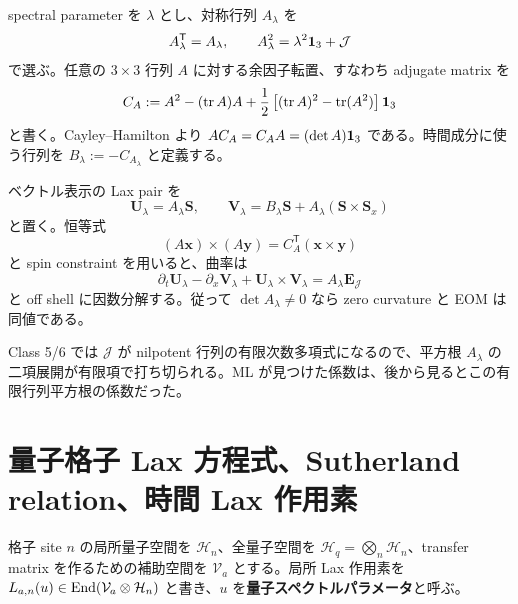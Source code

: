 spectral parameter を $\lambda$ とし、対称行列 $A_\lambda$ を
\begin{equation}
A_\lambda^{\mathsf T}=A_\lambda,\qquad A_\lambda^2=\lambda^2\mathbf 1_{3}+\mathcal J
\label{eq:Aroot}
\end{equation}
で選ぶ。任意の $3\times3$ 行列 $A$ に対する余因子転置、すなわち adjugate matrix を
\begin{equation}
C_A:=A^2-(\operatorname{tr} A)A+\frac12\left[(\operatorname{tr} A)^2-\operatorname{tr}(A^2)\right]\mathbf 1_{3}
\label{eq:adj}
\end{equation}
と書く。Cayley--Hamilton より $AC_A=C_AA=(\det A)\mathbf 1_{3}$ である。時間成分に使う行列を $B_\lambda:=-C_{A_\lambda}$ と定義する。

ベクトル表示の Lax pair を
\begin{equation}
\boldsymbol U_\lambda=A_\lambda\boldsymbol S,
\qquad
\boldsymbol V_\lambda=B_\lambda\boldsymbol S+A_\lambda(\boldsymbol S\times\boldsymbol S_x)
\label{eq:genLax}
\end{equation}
と置く。恒等式
\begin{equation}
(A\boldsymbol x)\times(A\boldsymbol y)=C_A^{\mathsf T}(\boldsymbol x\times\boldsymbol y)
\label{eq:crossadj}
\end{equation}
と spin constraint を用いると、曲率は
\begin{equation}
\partial_t\boldsymbol U_\lambda-\partial_x\boldsymbol V_\lambda+\boldsymbol U_\lambda\times\boldsymbol V_\lambda
=A_\lambda\boldsymbol E_{\mathcal J}
\label{eq:genericFactor}
\end{equation}
と off shell に因数分解する。従って $\det A_\lambda\neq0$ なら zero curvature と EOM は同値である。

Class 5/6 では $\mathcal J$ が nilpotent 行列の有限次数多項式になるので、平方根 $A_\lambda$ の二項展開が有限項で打ち切られる。ML が見つけた係数は、後から見るとこの有限行列平方根の係数だった。

\section{量子格子 Lax 方程式、Sutherland relation、時間 Lax 作用素}
格子 site $n$ の局所量子空間を $\mathcal H_n$、全量子空間を $\mathcal H_q=\bigotimes_n\mathcal H_n$、transfer matrix を作るための補助空間を $\mathcal V_a$ とする。局所 Lax 作用素を $L_{a,n}(u)\in\operatorname{End}(\mathcal V_a\otimes\mathcal H_n)$ と書き、$u$ を\textbf{量子スペクトルパラメータ}と呼ぶ。


